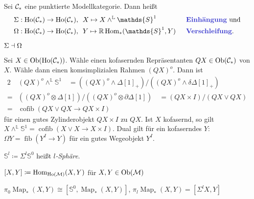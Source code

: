 \documentclass{cheat-sheet}
\newcommand{\Cyl}[1]{#1 \!\times\! I} %
\newcommand{\PO}[1]{{#1}^I} %
\newcommand{\ModC}{\mathcal{M}} %
\DeclareMathOperator{\Ho}{Ho} %
\newcommand{\LL}{\mathbb{L}} %
\newcommand{\RR}{\mathbb{R}} %
\DeclareMathOperator{\Map}{Map} %
\DeclareMathOperator{\fib}{fib} %
\DeclareMathOperator{\cofib}{cofib} %
\newcommand{\Sph}{\mathds{S}} %
\begin{document}
\begin{defn}
  Sei $\mathcal{C}_*$ eine punktierte Modellkategorie.
  Dann heißt
  \begin{alignat*}{4}
    & \Sigma : \Ho(\Cat_*) \to \Ho(\Cat_*), \enspace X \mapsto X \wedge^{\LL} \Sph^1 &&
    \text{\enspace\emph{Einhängung} und} \\
    & \Omega : \Ho(\Cat_*) \to \Ho(\Cat_*), \enspace Y \mapsto \RR \Hom_*(\Sph^1, Y) &&
    \text{\enspace\emph{Verschleifung}.}
  \end{alignat*}
\end{defn}

\begin{bem}
  $\Sigma \dashv \Omega$
\end{bem}

\begin{konstr}
  Sei $X \in \Ob(\Ho(\Cat_*))$.
  Wähle einen kofasernden Repräsentanten $QX \in \operatorname{Ob}(\mathcal{C}_*)$ von $X$.
  Wähle dann einen komsimplizialen Rahmen $(QX)^o$.
  Dann ist
  \begin{alignat*}{2}
    & (QX)^o \wedge^{\LL} \Sph^1 \quad
    = \left( (QX)^o \wedge \Delta[1]_+ \right) / \left( (QX)^o \wedge \delta \Delta[1]_+ \right) \\
    = & \left( (QX)^o \otimes \Delta[1] \right) / \left( (QX)^o \otimes \partial \Delta[1] \right) \quad
    = \left( QX \times I \right) / (QX \vee QX) \\
    = & \cofib(QX \vee QX \to \Cyl{QX})
  \end{alignat*}
  für einen gutes Zylinderobjekt $\Cyl{QX}$ zu $QX$.
  Ist $X$ kofasernd, so gilt $X \wedge^\LL \Sph^1 = \cofib(X \vee X \to \Cyl{X})$.
  Dual gilt für ein kofaserndes $Y$: $\Omega Y = \fib(\PO{Y} \to Y)$ für ein gutes Wegeobjekt $\PO{Y}$.
\end{konstr}

\begin{defn}
  $\Sph^l \coloneqq \Sigma^l \Sph^0$ heißt \emph{$l$-Sphäre}.
\end{defn}


\begin{nota}
  $[X, Y] \coloneqq \Hom_{\Ho(\ModC)}(X, Y)$ für $X, Y \in \Ob(\ModC)$
\end{nota}

\begin{bem}
  $\pi_0 \Map_*(X, Y) \cong [\Sph^0, \Map_*(X, Y)]$, \quad
  $\pi_l \Map_*(X, Y) = [\Sigma^l X, Y]$
\end{bem}
\end{document}
